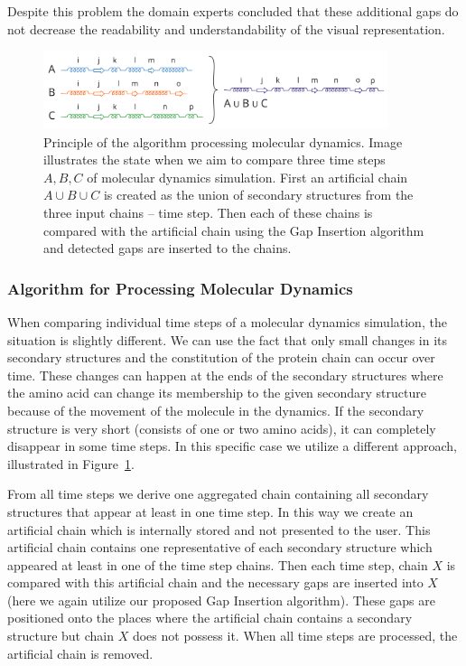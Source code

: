 \documentclass[twocolumn]{bmcart}%
\begin{document}
Despite this problem the domain experts concluded that these additional gaps do not decrease the readability and understandability of the visual representation.

\begin{figure}[thb]
  \centering
  \includegraphics[width=0.9\textwidth]{pics/second.pdf}
  \caption{Principle of the algorithm processing molecular dynamics. Image illustrates the state when we aim to compare three time steps $A, B, C$ of molecular dynamics simulation. First an artificial chain $A \cup B \cup C$ is created as the union of secondary structures from the three input chains -- time step. Then each of these chains is compared with the artificial chain using the Gap Insertion algorithm and detected gaps are inserted to the chains.}
  \label{fig:alg2}
\end{figure}

\subsubsection*{Algorithm for Processing Molecular Dynamics}
When comparing individual time steps of a molecular dynamics simulation, the situation is slightly different. 
We can use the fact that only small changes in its secondary structures and the constitution of the protein chain can occur over time.
These changes can happen at the ends of the secondary structures where the amino acid can change its membership to the given secondary structure because of the movement of the molecule in the dynamics.
If the secondary structure is very short (consists of one or two amino acids), it can completely disappear in some time steps.
In this specific case we utilize a different approach, illustrated in Figure~\ref{fig:alg2}.

From all time steps we derive one aggregated chain containing all secondary structures that appear at least in one time step. 
In this way we create an artificial chain which is internally stored and not presented to the user.
This artificial chain contains one representative of each secondary structure which appeared at least in one of the time step chains.
Then each time step, chain $X$ is compared with this artificial chain and the necessary gaps are inserted into $X$ (here we again utilize our proposed Gap Insertion algorithm).
These gaps are positioned onto the places where the artificial chain contains a secondary structure but chain $X$ does not possess it. 
When all time steps are processed, the artificial chain is removed.
\end{document}
